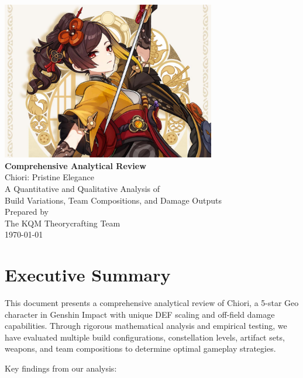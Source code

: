 \documentclass[12pt,a4paper]{article}
\begin{document}
\begin{titlepage}
    \centering
    \vspace*{1cm}
    \includegraphics[width=0.7\textwidth]{chiori_banner.png}\\[1cm]
    {\Huge \textbf{Comprehensive Analytical Review}\\[0.5cm]}
    {\huge \textcolor{geodark}{Chiori: Pristine Elegance}\\[2cm]}
    {\Large A Quantitative and Qualitative Analysis of\\
    Build Variations, Team Compositions, and Damage Outputs\\[2cm]}
    {\large Prepared by\\
    The KQM Theorycrafting Team\\[1cm]}
    {\large \today}
    \vfill
\end{titlepage}

\tableofcontents
\newpage

\section{Executive Summary}

This document presents a comprehensive analytical review of Chiori, a 5-star Geo character in Genshin Impact with unique DEF scaling and off-field damage capabilities. Through rigorous mathematical analysis and empirical testing, we have evaluated multiple build configurations, constellation levels, artifact sets, weapons, and team compositions to determine optimal gameplay strategies.

Key findings from our analysis:
\end{document}
